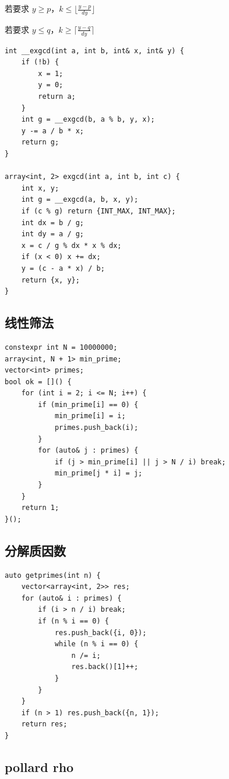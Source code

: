 \documentclass[UTF8]{ctexart}
\begin{document}
\begin{sloppypar}
若要求 $y\ge p$，$k\le\lfloor \frac{y-p}{dy}\rfloor$

若要求 $y\le q$，$k\ge\lceil \frac{y-q}{dy}\rceil$

\begin{lstlisting}[style=cpp]
int __exgcd(int a, int b, int& x, int& y) {
    if (!b) {
        x = 1;
        y = 0;
        return a;
    }
    int g = __exgcd(b, a % b, y, x);
    y -= a / b * x;
    return g;
}

array<int, 2> exgcd(int a, int b, int c) {
    int x, y;
    int g = __exgcd(a, b, x, y);
    if (c % g) return {INT_MAX, INT_MAX};
    int dx = b / g;
    int dy = a / g;
    x = c / g % dx * x % dx;
    if (x < 0) x += dx;
    y = (c - a * x) / b;
    return {x, y};
}
\end{lstlisting}

\subsection{线性筛法}

\begin{lstlisting}[style=cpp]
constexpr int N = 10000000;
array<int, N + 1> min_prime;
vector<int> primes;
bool ok = []() {
    for (int i = 2; i <= N; i++) {
        if (min_prime[i] == 0) {
            min_prime[i] = i;
            primes.push_back(i);
        }
        for (auto& j : primes) {
            if (j > min_prime[i] || j > N / i) break;
            min_prime[j * i] = j;
        }
    }
    return 1;
}();
\end{lstlisting}

\subsection{分解质因数}

\begin{lstlisting}[style=cpp]
auto getprimes(int n) {
    vector<array<int, 2>> res;
    for (auto& i : primes) {
        if (i > n / i) break;
        if (n % i == 0) {
            res.push_back({i, 0});
            while (n % i == 0) {
                n /= i;
                res.back()[1]++;
            }
        }
    }
    if (n > 1) res.push_back({n, 1});
    return res;
}
\end{lstlisting}

\subsection{pollard rho}


\end{sloppypar}
\end{document}
